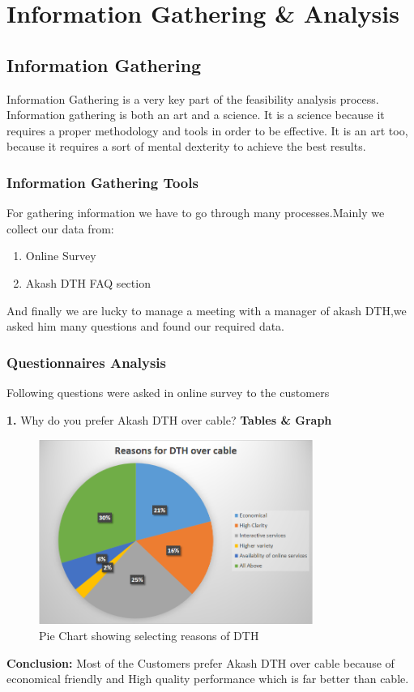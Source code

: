 \chapter{Information Gathering \& Analysis}
\begin{spacing}{1}
\setlength{\parskip}{0.3in}
\graphicspath{{./Chapter3/}}

\section{Information Gathering}
Information Gathering is a very key part of the feasibility analysis process. Information gathering is both an art and a science. It is a science because it requires a proper methodology and tools in order to be effective. It is an art too, because it requires a sort of mental dexterity to achieve the best results.

\subsection{Information Gathering Tools}
For gathering information we have to go through many processes.Mainly we collect our data from:
\begin{enumerate}
\item Online Survey
\item Akash DTH FAQ section 
\end{enumerate}
And finally we are lucky to manage a meeting with a manager of akash DTH,we asked him many questions and found our required data.

\subsection{Questionnaires Analysis}
Following questions were asked in online survey to the customers 

{\bf 1.} Why do you prefer Akash DTH over cable?\newline
{\bf Tables \& Graph}
\begin{figure}[H]
	\centering
	\includegraphics[width=0.8\textwidth]{fig1}
	\caption{Pie Chart showing selecting reasons of DTH}
	\label{fig:PieChart1}
\end{figure}
{\bf Conclusion:}\newline
Most of the Customers prefer Akash DTH over cable because of economical friendly and High quality performance which is far better than cable.


\end{spacing}
